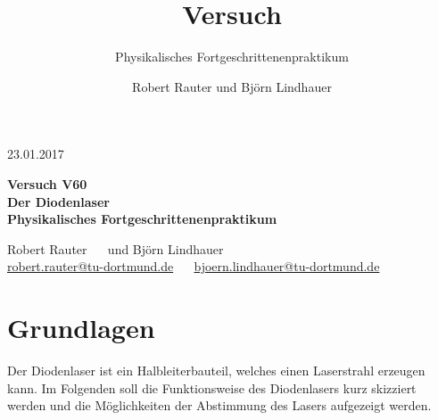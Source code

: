 \documentclass[captions=tableheading]{scrartcl}
\title{Versuch \versuchnummer\\ \versuchname}
\subtitle{Physikalisches Fortgeschrittenenpraktikum}
\author{Robert Rauter und Björn Lindhauer}
\date{\versuchdatum}
\newcommand{\versuchnummer}{V60}
\newcommand{\versuchname}{Der Diodenlaser}
\newcommand{\versuchdatum}{23.01.2017}
\begin{document}
\begin{titlepage}
{\large \versuchdatum}
\vspace{7cm}
\begin{center}
\textbf{\huge Versuch \versuchnummer}\\\vspace{0.5cm}
\textbf{\huge \versuchname}\\
\vspace{0.2cm}
\textbf{Physikalisches Fortgeschrittenenpraktikum}\\
\vspace{9cm}

{\Large Robert Rauter \ \ \hspace{1.5cm} und \hspace{1.5cm} Björn Lindhauer}\\
{ \url{robert.rauter@tu-dortmund.de} \ \ \hspace{2cm} \url{bjoern.lindhauer@tu-dortmund.de}}
\end{center}
\end{titlepage}

\section{Grundlagen}
Der Diodenlaser ist ein Halbleiterbauteil, welches einen Laserstrahl erzeugen kann. Im Folgenden soll die Funktionsweise des Diodenlasers kurz skizziert werden und die Möglichkeiten der Abstimmung des Lasers aufgezeigt werden.
\end{document}
